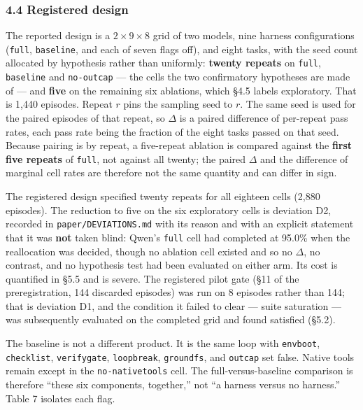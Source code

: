 \documentclass[
  10pt,
  a4paper,
]{article}
\let\oldtexttt\texttt
\renewcommand{\texttt}[1]{{\small\oldtexttt{#1}}}
\begin{document}
\subsubsection{4.4 Registered design}\label{registered-design}

The reported design is a \(2 \times 9 \times 8\) grid of two models,
nine harness configurations (\texttt{full}, \texttt{baseline}, and each
of seven flags off), and eight tasks, with the seed count allocated by
hypothesis rather than uniformly: \textbf{twenty repeats} on
\texttt{full}, \texttt{baseline} and \texttt{no-outcap} --- the cells
the two confirmatory hypotheses are made of --- and \textbf{five} on the
remaining six ablations, which §4.5 labels exploratory. That is 1,440
episodes. Repeat \(r\) pins the sampling seed to \(r\). The same seed is
used for the paired episodes of that repeat, so \(\Delta\) is a paired
difference of per-repeat pass rates, each pass rate being the fraction
of the eight tasks passed on that seed. Because pairing is by repeat, a
five-repeat ablation is compared against the \textbf{first five repeats}
of \texttt{full}, not against all twenty; the paired \(\Delta\) and the
difference of marginal cell rates are therefore not the same quantity
and can differ in sign.

The registered design specified twenty repeats for all eighteen cells
(2,880 episodes). The reduction to five on the six exploratory cells is
deviation D2, recorded in \texttt{paper/DEVIATIONS.md} with its reason
and with an explicit statement that it was \textbf{not} taken blind:
Qwen's \texttt{full} cell had completed at 95.0\% when the reallocation
was decided, though no ablation cell existed and so no \(\Delta\), no
contrast, and no hypothesis test had been evaluated on either arm. Its
cost is quantified in §5.5 and is severe. The registered pilot gate (§11
of the preregistration, 144 discarded episodes) was run on 8 episodes
rather than 144; that is deviation D1, and the condition it failed to
clear --- suite saturation --- was subsequently evaluated on the
completed grid and found satisfied (§5.2).

The baseline is not a different product. It is the same loop with
\texttt{envboot}, \texttt{checklist}, \texttt{verifygate},
\texttt{loopbreak}, \texttt{groundfs}, and \texttt{outcap} set false.
Native tools remain except in the \texttt{no-nativetools} cell. The
full-versus-baseline comparison is therefore ``these six components,
together,'' not ``a harness versus no harness.'' Table 7 isolates each
flag.
\end{document}
